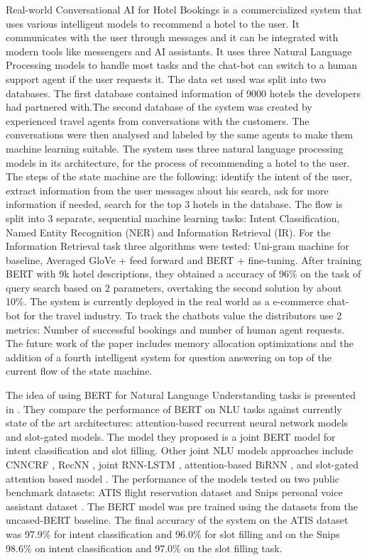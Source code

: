 \documentclass[runningheads,a4paper,11pt]{report}
\begin{document}
    Real-world Conversational AI for Hotel Bookings \cite{Bai19} is a commercialized system that uses various intelligent models to recommend a hotel to the user. It communicates with the user through messages and it can be integrated with modern tools like messengers and AI assistants. It uses three Natural Language Processing models to handle most tasks and the chat-bot can switch to a human support agent if the user requests it. 
	The data set used was split into two databases. The first database contained information of 9000 hotels the developers had partnered with.The second database of the system was created by experienced travel agents from conversations with the customers. The conversations were then analysed and labeled by the same agents to make them machine learning suitable.
	The system uses three natural language processing models in its architecture, for the process of recommending a hotel to the user. The steps of the state machine are the following: identify the intent of the user, extract information from the user messages about his search, ask for more information if needed, search for the top 3 hotels in the database. The flow is split into 3 separate, sequential machine learning tasks: Intent Classification, Named Entity Recognition (NER) and Information Retrieval (IR).
	For the Information Retrieval task three algorithms were tested: Uni-gram machine for baseline, Averaged GloVe + feed forward and BERT + fine-tuning. After training BERT with 9k hotel descriptions, they obtained a accuracy of 96\% on the task of query search based on 2 parameters, overtaking the second solution by about 10\%.
	The system is currently deployed in the real world as a e-commerce chat-bot for the  travel industry. To track the chatbots value the distributors use 2 metrics: Number of successful bookings and number of human agent requests. The future work of the paper includes memory allocation optimizations and the addition of a fourth intelligent system for question answering on top of the current flow of the state machine. 

	
	The idea of using BERT for Natural Language Understanding tasks is presented in \cite{Qian19}. They compare the performance of BERT on NLU tasks against currently state of the art architectures: attention-based recurrent neural network models and slot-gated models. The model they proposed is a joint BERT model for intent classification and slot filling. Other joint NLU models approaches include CNNCRF \cite{Xu13}, RecNN \cite{Guo14}, joint RNN-LSTM \cite{Dilek16}, attention-based BiRNN \cite{Liu16}, and slot-gated attention based model \cite{Goo18}. 
	The performance of the models tested on two public benchmark datasets: ATIS flight reservation dataset \cite{gok10} and Snips personal voice assistant dataset \cite{ali16}. The BERT model was pre trained using the datasets from the uncased-BERT baseline. The final accuracy of the system on the ATIS dataset was 97.9\% for intent classification and 96.0\% for slot filling and on the Snips 98.6\% on intent classification and 97.0\% on the slot filling task.
\end{document}
